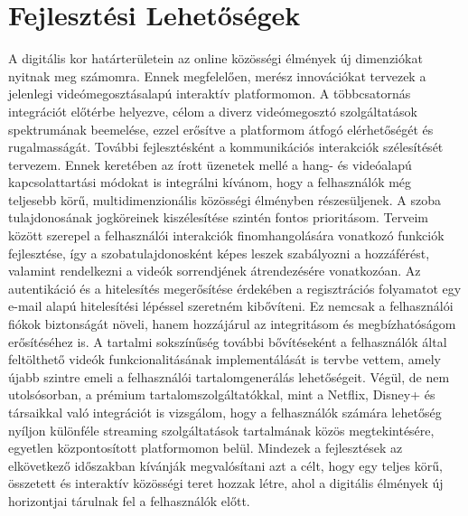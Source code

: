 \chapter{Fejleszt\'esi Lehetős\'egek}
A digitális kor határterületein az online közösségi élmények új dimenziókat nyitnak meg számomra. Ennek megfelelően, merész innovációkat tervezek a jelenlegi videómegosztásalapú interaktív platformomon. A többcsatornás integrációt előtérbe helyezve, célom a diverz videómegosztó szolgáltatások spektrumának beemelése, ezzel erősítve a platformom átfogó elérhetőségét és rugalmasságát.
További fejlesztésként a kommunikációs interakciók szélesítését tervezem. Ennek keretében az írott üzenetek mellé a hang- és videóalapú kapcsolattartási módokat is integrálni kívánom, hogy a felhasználók még teljesebb körű, multidimenzionális közösségi élményben részesüljenek.
A szoba tulajdonosának jogköreinek kiszélesítése szintén fontos prioritásom. Terveim között szerepel a felhasználói interakciók finomhangolására vonatkozó funkciók fejlesztése, így a szobatulajdonosként képes leszek szabályozni a hozzáférést, valamint rendelkezni a videók sorrendjének átrendezésére vonatkozóan.
Az autentikáció és a hitelesítés megerősítése érdekében a regisztrációs folyamatot egy e-mail alapú hitelesítési lépéssel szeretném kibővíteni. Ez nemcsak a felhasználói fiókok biztonságát növeli, hanem hozzájárul az integritásom és megbízhatóságom erősítéséhez is.
A tartalmi sokszínűség további bővítéseként a felhasználók által feltölthető videók funkcionalitásának implementálását is tervbe vettem, amely újabb szintre emeli a felhasználói tartalomgenerálás lehetőségeit.
Végül, de nem utolsósorban, a prémium tartalomszolgáltatókkal, mint a Netflix, Disney+ és társaikkal való integrációt is vizsgálom, hogy a felhasználók számára lehetőség nyíljon különféle streaming szolgáltatások tartalmának közös megtekintésére, egyetlen központosított platformomon belül.
Mindezek a fejlesztések az elkövetkező időszakban kívánják megvalósítani azt a célt, hogy egy teljes körű, összetett és interaktív közösségi teret hozzak létre, ahol a digitális élmények új horizontjai tárulnak fel a felhasználók előtt.
